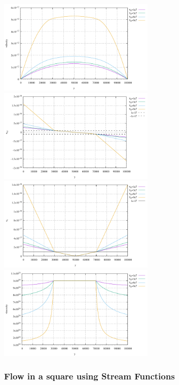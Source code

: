\begin{center}
\includegraphics[width=7.5cm]{images/mms/channel_hb/velocity_taus}
\includegraphics[width=7.5cm]{images/mms/channel_hb/exy_taus}\\
\includegraphics[width=7.5cm]{images/mms/channel_hb/ee_taus}
\includegraphics[width=7.5cm]{images/mms/channel_hb/eta_taus}
\end{center}






\newpage
\subsubsection{Flow in a square using Stream Functions \label{ss:square_streamfct} }

